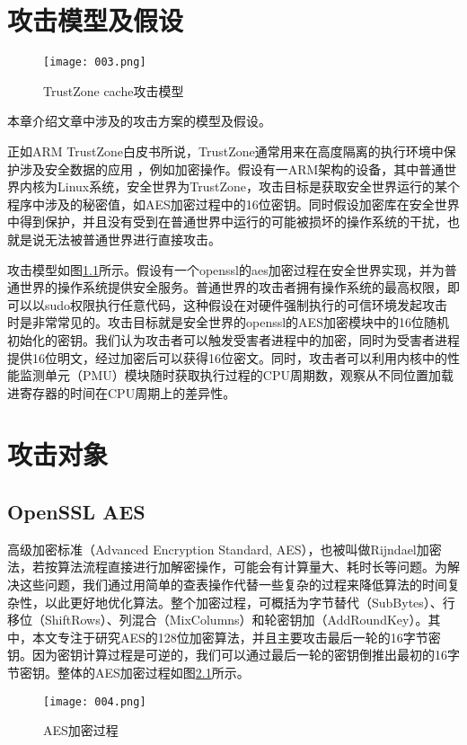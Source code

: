 \chapter{攻击模型及假设}
\begin{figure}[H]
	\centering
	\texttt{[image: 003.png]}
	\caption{TrustZone cache攻击模型}
	\label{003}
\end{figure}

本章介绍文章中涉及的攻击方案的模型及假设。

正如ARM TrustZone白皮书\cite{holdings2009arm}所说，TrustZone通常用来在高度隔离的执行环境中保护涉及安全数据的应用 ，例如加密操作。假设有一ARM架构的设备，其中普通世界内核为Linux系统，安全世界为TrustZone，攻击目标是获取安全世界运行的某个程序中涉及的秘密值，如AES加密过程中的16位密钥。同时假设加密库在安全世界中得到保护，并且没有受到在普通世界中运行的可能被损坏的操作系统的干扰，也就是说无法被普通世界进行直接攻击。

攻击模型如图\ref{003}所示。假设有一个openssl的aes加密过程在安全世界实现，并为普通世界的操作系统提供安全服务。普通世界的攻击者拥有操作系统的最高权限，即可以以sudo权限执行任意代码，这种假设在对硬件强制执行的可信环境发起攻击时是非常常见的。攻击目标就是安全世界的openssl的AES加密模块中的16位随机初始化的密钥。我们认为攻击者可以触发受害者进程中的加密，同时为受害者进程提供16位明文，经过加密后可以获得16位密文。同时，攻击者可以利用内核中的性能监测单元（PMU）模块随时获取执行过程的CPU周期数，观察从不同位置加载进寄存器的时间在CPU周期上的差异性。



\chapter{攻击对象}

\section{OpenSSL AES}
高级加密标准（Advanced Encryption Standard, AES），也被叫做Rijndael加密法，若按算法流程直接进行加解密操作，可能会有计算量大、耗时长等问题。为解决这些问题，我们通过用简单的查表操作代替一些复杂的过程来降低算法的时间复杂性，以此更好地优化算法。整个加密过程，可概括为字节替代（SubBytes）、行移位（ShiftRows）、列混合（MixColumns）和轮密钥加（AddRoundKey）。其中，本文专注于研究AES的128位加密算法，并且主要攻击最后一轮的16字节密钥。因为密钥计算过程是可逆的，我们可以通过最后一轮的密钥倒推出最初的16字节密钥。整体的AES加密过程如图\ref{004}所示。

\begin{figure}[H]
	\centering
	\texttt{[image: 004.png]}
	\caption{AES加密过程}
	\label{004}
\end{figure}

